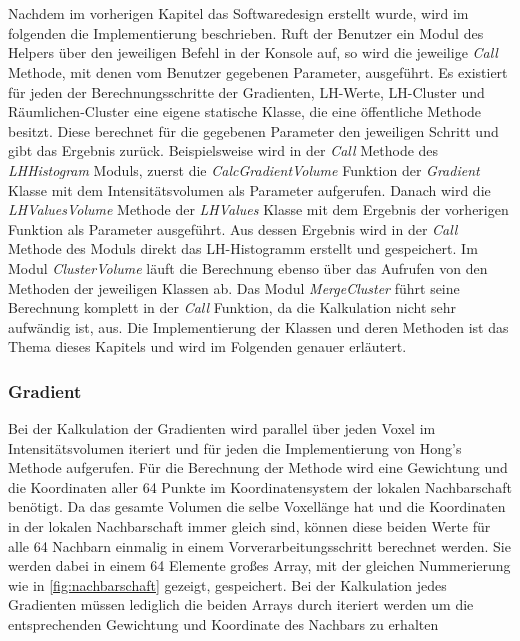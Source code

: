 \chapter{}
\label{sec:implementation}




Nachdem im vorherigen Kapitel das Softwaredesign erstellt wurde, wird im folgenden die Implementierung beschrieben.
\newline
Ruft der Benutzer ein Modul des Helpers über den jeweiligen Befehl in der Konsole auf, so wird die jeweilige \textit{Call} Methode, mit denen vom Benutzer gegebenen Parameter, ausgeführt.
\newline
Es existiert für jeden der Berechnungsschritte der Gradienten, LH-Werte, LH-Cluster und Räumlichen-Cluster eine eigene statische Klasse, die eine öffentliche Methode besitzt. Diese berechnet für die gegebenen Parameter den jeweiligen Schritt und gibt das Ergebnis zurück. 
\newline
Beispielsweise wird in der \textit{Call} Methode des \textit{LHHistogram} Moduls, zuerst die \textit{CalcGradientVolume} Funktion der \textit{Gradient} Klasse mit dem Intensitätsvolumen als Parameter aufgerufen. Danach wird die \textit{LHValuesVolume} Methode der \textit{LHValues} Klasse mit dem Ergebnis der vorherigen Funktion als Parameter ausgeführt. Aus dessen Ergebnis wird in der \textit{Call} Methode des Moduls direkt das LH-Histogramm erstellt und gespeichert.
\newline
Im Modul \textit{ClusterVolume} läuft die Berechnung ebenso über das Aufrufen von den Methoden der jeweiligen Klassen ab.
\newline
Das Modul \textit{MergeCluster} führt seine Berechnung komplett in der \textit{Call} Funktion, da die Kalkulation nicht sehr aufwändig ist, aus.
\newline
Die Implementierung der Klassen und deren Methoden ist das Thema dieses Kapitels und wird im Folgenden genauer erläutert.



\subsection{Gradient}

Bei der  Kalkulation der Gradienten wird parallel über jeden Voxel im Intensitätsvolumen iteriert und für jeden die Implementierung von Hong's Methode \cite{hong2003method} aufgerufen.
\newline
Für die Berechnung der Methode wird eine Gewichtung und die Koordinaten aller 64 Punkte im Koordinatensystem der lokalen Nachbarschaft benötigt. Da das gesamte Volumen die selbe Voxellänge hat und die Koordinaten in der lokalen Nachbarschaft immer gleich sind, können diese beiden Werte für alle 64 Nachbarn einmalig in einem Vorverarbeitungsschritt berechnet werden. Sie werden dabei in einem 64 Elemente großes Array, mit der gleichen Nummerierung wie in \autoref{fig:nachbarschaft} gezeigt, gespeichert. Bei der Kalkulation jedes Gradienten müssen lediglich die beiden Arrays durch iteriert werden um die entsprechenden Gewichtung und Koordinate  des Nachbars zu erhalten

